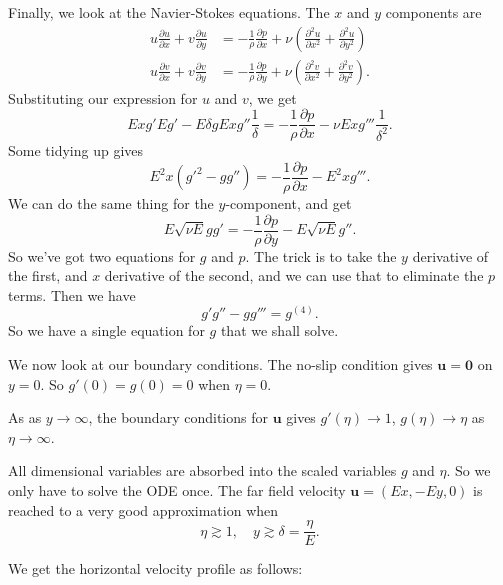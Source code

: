 \documentclass[a4paper]{article}
\begin{document}
\begin{eg}
  Finally, we look at the Navier-Stokes equations. The $x$ and $y$ components are
  \begin{align*}
    u \frac{\partial u}{\partial x} + v \frac{\partial u}{\partial y} &= -\frac{1}{\rho}\frac{\partial p}{\partial x} + \nu \left(\frac{\partial^2 u}{\partial x^2} + \frac{\partial^2 u}{\partial y^2}\right)\\
    u \frac{\partial v}{\partial x} + v \frac{\partial v}{\partial y} &= -\frac{1}{\rho}\frac{\partial p}{\partial y} + \nu \left(\frac{\partial^2 v}{\partial x^2} + \frac{\partial^2 v}{\partial y^2}\right).
  \end{align*}
  Substituting our expression for $u$ and $v$, we get
  \[
    Ex g'E g' - E \delta g E x g'' \frac{1}{\delta} = -\frac{1}{\rho} \frac{\partial p}{\partial x} - \nu E xg''' \frac{1}{\delta^2}.
  \]
  Some tidying up gives
  \[
    E^2 x(g'^2 - gg'') = -\frac{1}{\rho} \frac{\partial p}{\partial x} - E^2 x g'''.
  \]
  We can do the same thing for the $y$-component, and get
  \[
    E\sqrt{\nu E}gg' = -\frac{1}{\rho} \frac{\partial p}{\partial y} - E\sqrt{\nu E}g''.
  \]
  So we've got two equations for $g$ and $p$. The trick is to take the $y$ derivative of the first, and $x$ derivative of the second, and we can use that to eliminate the $p$ terms. Then we have
  \[
    g'g'' - gg''' = g^{(4)}.
  \]
  So we have a single equation for $g$ that we shall solve.

  We now look at our boundary conditions. The no-slip condition gives $\mathbf{u} = \mathbf{0}$ on $y = 0$. So $g'(0) = g(0) = 0$ when $\eta = 0$.

  As as $y \to \infty$, the boundary conditions for $\mathbf{u}$ gives $g'(\eta) \to 1$, $g(\eta) \to \eta$ as $\eta \to \infty$.

  All dimensional variables are absorbed into the scaled variables $g$ and $\eta$. So we only have to solve the ODE once. The far field velocity $\mathbf{u} = (Ex, -E y, 0)$ is reached to a very good approximation when
  \[
    \eta \gtrsim 1,\quad y \gtrsim \delta = \frac{\eta}{E}.
  \]
  \begin{center}
  \end{center}
  We get the horizontal velocity profile as follows:
  \begin{center}
\end{center}
\end{eg}
\end{document}
